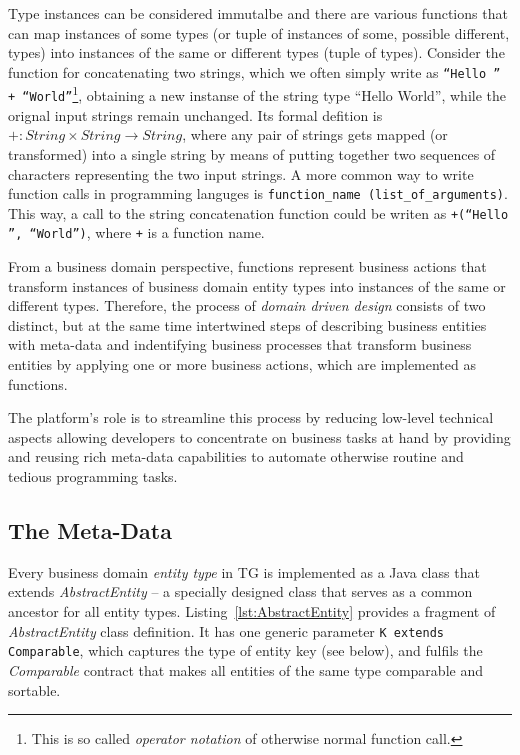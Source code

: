   Type instances can be considered immutalbe and there are various functions that can map instances of some types (or tuple of instances of some, possible different, types) into instances of the same or different types (tuple of types).
  Consider the function for concatenating two strings, which we often simply write as \texttt{``Hello '' + ``World''}\footnote{This is so called \emph{operator notation} of otherwise normal function call.}, obtaining a new instanse of the string type ``Hello World'', while the orignal input strings remain unchanged.
  Its formal defition is $+:String\times String \rightarrow String$, where any pair of strings gets mapped (or transformed) into a single string by means of putting together two sequences of characters representing the two input strings.
  A more common way to write function calls in programming languges is \texttt{function\_name (list\_of\_arguments)}.
  This way, a call to the string concatenation function could be writen as \texttt{+(``Hello '', ``World'')}, where \texttt{+} is a function name.

  From a business domain perspective, functions represent business actions that transform instances of business domain entity types into instances of the same or different types.
  Therefore, the process of \emph{domain driven design} consists of two distinct, but at the same time intertwined steps of describing business entities with meta-data and indentifying business processes that transform business entities by applying one or more business actions, which are implemented as functions.
  
  The platform's role is to streamline this process by reducing low-level technical aspects allowing developers to concentrate on business tasks at hand by providing and reusing rich meta-data capabilities to automate otherwise routine and tedious programming tasks.

\subsection{The Meta-Data}

  Every business domain \emph{entity type} in TG is implemented as a Java class that extends \emph{AbstractEntity} -- a specially designed class that serves as a common ancestor for all entity types.
  Listing~\ref{lst:AbstractEntity} provides a fragment of \emph{AbstractEntity} class definition.
  It has one generic parameter \texttt{K extends Comparable}, which captures the type of entity key (see below), and fulfils the \emph{Comparable} contract that makes all entities of the same type comparable and sortable.
  
